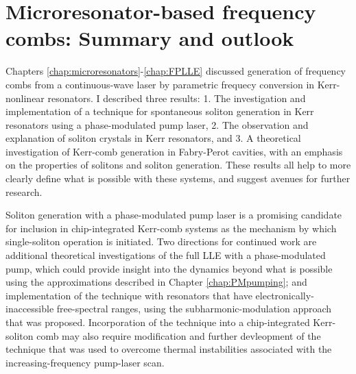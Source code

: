  \chapter{Microresonator-based frequency combs: Summary and outlook}\label{chap:conclusion}

Chapters \ref{chap:microresonators}-\ref{chap:FPLLE} discussed generation of frequency combs from a continuous-wave laser by parametric frequecy conversion in Kerr-nonlinear resonators. I described three results: 1. The investigation and implementation of a technique for spontaneous soliton generation in Kerr resonators using a phase-modulated pump laser, 2. The observation and explanation of soliton crystals in Kerr resonators, and 3. A theoretical investigation of Kerr-comb generation in Fabry-Perot cavities, with an emphasis on the properties of solitons and soliton generation. These results all help to more clearly define what is possible with these systems, and suggest avenues for further research. 

Soliton generation with a phase-modulated pump laser is a promising candidate for inclusion in chip-integrated Kerr-comb systems as the mechanism by which single-soliton operation is initiated. Two directions for continued work are additional theoretical investigations of the full LLE with a phase-modulated pump, which could provide insight into the dynamics beyond what is possible using the approximations described in Chapter \ref{chap:PMpumping}; and implementation of the technique with resonators that have electronically-inaccessible free-spectral ranges, using the subharmonic-modulation approach that was proposed. Incorporation of the technique into a chip-integrated Kerr-soliton comb may also require modification and further devleopment of the technique that was used to overcome thermal instabilities associated with the increasing-frequency pump-laser scan.

